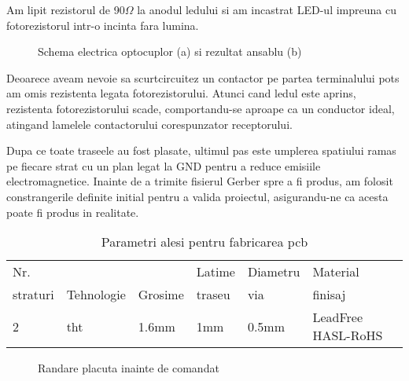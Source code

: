 Am lipit rezistorul de 90$\Omega$ la anodul ledului si am incastrat LED-ul impreuna cu fotorezistorul intr-o incinta fara lumina.

\begin{figure}[!ht]
\begin{center}
  \caption{Schema electrica optocuplor (a) si rezultat ansablu (b)}
  \label{fig:opto}
\end{center}
\end{figure}


Deoarece aveam nevoie sa scurtcircuitez un contactor pe partea terminalului \acrshort{pots} am omis rezistenta legata fotorezistorului. Atunci cand ledul este aprins, rezistenta fotorezistorului scade, comportandu-se aproape ca un conductor ideal, atingand lamelele contactorului corespunzator receptorului.

Dupa ce toate traseele au fost plasate, ultimul pas este umplerea spatiului ramas pe fiecare strat cu un plan legat la GND pentru a reduce emisiile electromagnetice. Inainte de a trimite fisierul Gerber spre a fi produs, am folosit constrangerile definite initial pentru a valida proiectul, asigurandu-ne ca acesta poate fi produs in realitate.

\begin{table}[ht!]
\begin{tabular}{llllll}
\hline
Nr. &  &  & Latime & Diametru & Material \\ 
straturi & Tehnologie & Grosime & traseu & via & finisaj \\
\hline
\hline
2 & \acrshort{tht} & 1.6mm & 1mm & 0.5mm & LeadFree HASL-RoHS\\
\hline
\end{tabular}
\centering
\caption{Parametri alesi pentru fabricarea \acrshort{pcb}}
\label{tab:params}
\end{table}

\begin{figure}[!ht]
\begin{center}
  \caption{Randare placuta inainte de comandat}
  \label{fig:hat}
\end{center}
\end{figure}

